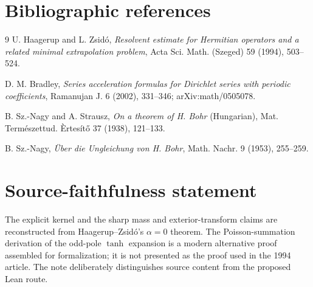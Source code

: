 \section*{Bibliographic references}

\begin{thebibliography}{9}
U. Haagerup and L. Zsid\'o,
\emph{Resolvent estimate for Hermitian operators and a related minimal extrapolation problem},
Acta Sci. Math. (Szeged) 59 (1994), 503--524.

D. M. Bradley,
\emph{Series acceleration formulas for Dirichlet series with periodic coefficients},
Ramanujan J. 6 (2002), 331--346; arXiv:math/0505078.

B. Sz.-Nagy and A. Strausz,
\emph{On a theorem of H. Bohr} (Hungarian),
Mat. Term\'eszettud. \`Ertes\'it\H{o} 37 (1938), 121--133.

B. Sz.-Nagy,
\emph{\"Uber die Ungleichung von H. Bohr},
Math. Nachr. 9 (1953), 255--259.
\end{thebibliography}

\section*{Source-faithfulness statement}

The explicit kernel and the sharp mass and exterior-transform claims are reconstructed from Haagerup--Zsid\'o's $\alpha=0$ theorem. The Poisson-summation derivation of the odd-pole $\tanh$ expansion is a modern alternative proof assembled for formalization; it is not presented as the proof used in the 1994 article. The note deliberately distinguishes source content from the proposed Lean route.


